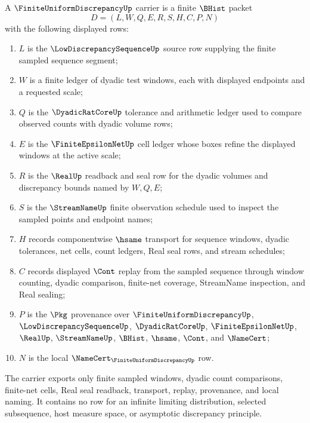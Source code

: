 \begin{definition}
\label{def:finite-uniform-discrepancy-carrier}
A $\FiniteUniformDiscrepancyUp$ carrier is a finite $\BHist$ packet
$$
D=(L,W,Q,E,R,S,H,C,P,N)
$$
with the following displayed rows:
\begin{enumerate}
\item $L$ is the $\LowDiscrepancySequenceUp$ source row supplying the finite sampled sequence segment;
\item $W$ is a finite ledger of dyadic test windows, each with displayed endpoints and a requested scale;
\item $Q$ is the $\DyadicRatCoreUp$ tolerance and arithmetic ledger used to compare observed counts with dyadic volume rows;
\item $E$ is the $\FiniteEpsilonNetUp$ cell ledger whose boxes refine the displayed windows at the active scale;
\item $R$ is the $\RealUp$ readback and seal row for the dyadic volumes and discrepancy bounds named by $W,Q,E$;
\item $S$ is the $\StreamNameUp$ finite observation schedule used to inspect the sampled points and endpoint names;
\item $H$ records componentwise $\hsame$ transport for sequence windows, dyadic tolerances, net cells, count ledgers, Real seal rows, and stream schedules;
\item $C$ records displayed $\Cont$ replay from the sampled sequence through window counting, dyadic comparison, finite-net coverage, StreamName inspection, and Real sealing;
\item $P$ is the $\Pkg$ provenance over $\FiniteUniformDiscrepancyUp$, $\LowDiscrepancySequenceUp$, $\DyadicRatCoreUp$, $\FiniteEpsilonNetUp$, $\RealUp$, $\StreamNameUp$, $\BHist$, $\hsame$, $\Cont$, and $\NameCert$;
\item $N$ is the local $\NameCert_{\FiniteUniformDiscrepancyUp}$ row.
\end{enumerate}
The carrier exports only finite sampled windows, dyadic count comparisons, finite-net cells, Real seal readback, transport, replay, provenance, and local naming. It contains no row for an infinite limiting distribution, selected subsequence, host measure space, or asymptotic discrepancy principle.
\end{definition}

